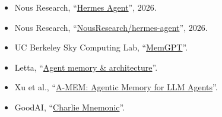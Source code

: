 \documentclass[12pt,a4paper]{article}
\begin{document}
\begin{itemize}
\tightlist
\item
  Nous Research, ``\href{https://hermes-agent.nousresearch.com/}{Hermes Agent}'', 2026.
\item
  Nous Research, ``\href{https://github.com/NousResearch/hermes-agent}{NousResearch/hermes-agent}'', 2026.
\item
  UC Berkeley Sky Computing Lab, ``\href{https://sky.cs.berkeley.edu/project/memgpt/}{MemGPT}''.
\item
  Letta, ``\href{https://docs.letta.com/guides/agents/architectures/memgpt}{Agent memory \& architecture}''.
\item
  Xu et al., ``\href{https://arxiv.org/abs/2502.12110}{A-MEM: Agentic Memory for LLM Agents}''.
\item
  GoodAI, ``\href{https://www.goodai.com/charlie-mnemonic/}{Charlie Mnemonic}''.
\end{itemize}
\end{document}
